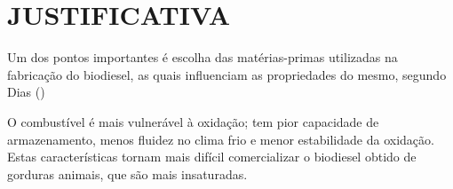 
\chapter{JUSTIFICATIVA}
\label{chap:justifiativa}

Um dos pontos importantes é escolha das matérias-primas utilizadas na fabricação do biodiesel, as quais influenciam as propriedades do mesmo, segundo Dias (\citeyear{Angelica})

O combustível é mais vulnerável à oxidação;  tem pior capacidade de armazenamento,  menos fluidez no clima frio e menor estabilidade da oxidação. Estas características tornam mais difícil comercializar o biodiesel obtido de gorduras animais, que são mais insaturadas.  \cite{Leggieri2018a}

\cite{DeMarco2019,Prausnitz,Goulart2019}

\cite{Rocha2011,Leggieri2018a,Costa2007,Wei2009,Boudouh2016,Costa2012,Costa2009}

